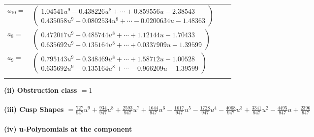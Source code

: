 \documentclass[1p]{elsarticle_modified}
\theoremstyle{definition}
\begin{document}
\begin{tabular}{m{7pt} m{180pt} m{7pt} m{180pt} }
\flushright $a_{10}=$&$\begin{pmatrix}1.04541 u^{9}-0.438226 u^{8}+\cdots+0.859556 u-2.38543\\0.435058 u^{9}+0.0802534 u^{8}+\cdots-0.0200634 u-1.48363\end{pmatrix}$ \\
\flushright $a_{8}=$&$\begin{pmatrix}0.472017 u^{9}-0.485744 u^{8}+\cdots+1.12144 u-1.70433\\0.635692 u^{9}-0.135164 u^{8}+\cdots+0.0337909 u-1.39599\end{pmatrix}$ \\
\flushright $a_{9}=$&$\begin{pmatrix}0.795143 u^{9}-0.348469 u^{8}+\cdots+1.58712 u-1.00528\\0.635692 u^{9}-0.135164 u^{8}+\cdots-0.966209 u-1.39599\end{pmatrix}$\\&\end{tabular}
\flushleft \textbf{(ii) Obstruction class $= 1$}\\~\\
\flushleft \textbf{(iii) Cusp Shapes $= \frac{727}{947} u^9+\frac{934}{947} u^8+\frac{2593}{947} u^7+\frac{1644}{947} u^6-\frac{1617}{947} u^5-\frac{1728}{947} u^4-\frac{4068}{947} u^3+\frac{3341}{947} u^2-\frac{4495}{947} u+\frac{2396}{947}$}\\~\\
\newpage\renewcommand{\arraystretch}{1}
\flushleft \textbf{(iv) u-Polynomials at the component}\newline \\
\end{document}
